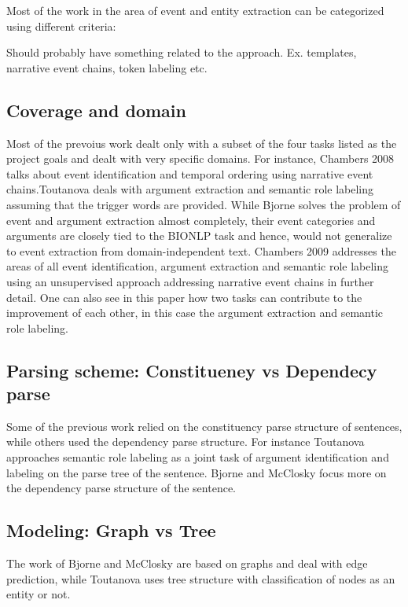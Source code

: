 Most of the work in the area of event and entity extraction can be categorized using different criteria:

Should probably have something related to the approach. Ex. templates, narrative event chains, token labeling etc.

\subsection {Coverage and domain} 
Most of the prevoius work dealt only with a subset of the four tasks listed as the project goals and dealt with very specific domains. For instance, Chambers 2008 talks about event identification and temporal ordering using narrative event chains.Toutanova deals with argument extraction and semantic role labeling assuming that the trigger words are provided. While Bjorne solves the problem of event and argument extraction almost completely, their event categories and arguments are closely tied to the BIONLP task and hence, would not generalize to event extraction from domain-independent text. Chambers 2009 addresses the areas of all event identification, argument extraction and semantic role labeling using an unsupervised approach addressing narrative event chains in further detail. One can also see in this paper how two tasks can contribute to the improvement of each other, in this case the argument extraction and semantic role labeling.
~
~\cite{mcclosky}

\subsection {Parsing scheme: Constitueney vs Dependecy parse}
Some of the previous work relied on the constituency parse structure of sentences, while others used the dependency parse structure. For instance Toutanova approaches semantic role labeling as a joint task of argument identification and labeling on the parse tree of the sentence. Bjorne and McClosky focus more on the dependency parse structure of the sentence.

\subsection {Modeling: Graph vs Tree} 
The work of Bjorne and McClosky are based on graphs and deal with edge prediction, while Toutanova uses tree structure with classification of nodes as an entity or not.
